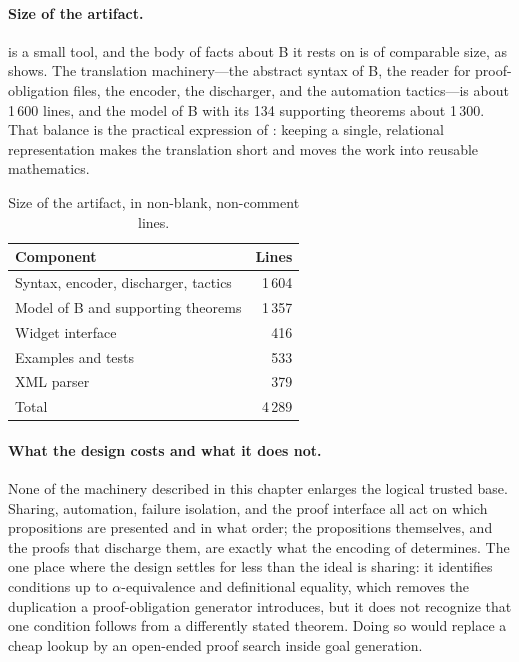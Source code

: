 \paragraph*{Size of the artifact.}
\barrel{} is a small tool, and the body of facts about B it rests on is of comparable size,
as  shows.
The translation machinery---the abstract syntax of B, the reader for proof-obligation
files, the encoder, the discharger, and the automation tactics---is about 1\,600 lines, and
the model of B with its 134 supporting theorems about 1\,300.
That balance is the practical expression of : keeping a
single, relational representation makes the translation short and moves the work into
reusable mathematics.

\begin{table}[t]
  \centering
  \small
  \begin{tabular}{lr}
    \toprule
    Component & Lines \\
    \midrule
    Syntax, encoder, discharger, tactics & 1\,604 \\
    Model of B and supporting theorems            & 1\,357 \\
    Widget interface                                  &    416 \\
    \midrule
    Examples and tests                                &    533 \\
    XML parser                                        &    379 \\
    \midrule
    Total                                             & 4\,289 \\
    \bottomrule
  \end{tabular}
  \caption{Size of the \barrel{} artifact, in non-blank, non-comment lines.}
  \label{tab:barrel-implementation}
\end{table}

\paragraph*{What the design costs and what it does not.}
None of the machinery described in this chapter enlarges the logical trusted base.
Sharing, automation, failure isolation, and the proof interface all act on which
propositions are presented and in what order; the propositions themselves, and the proofs
that discharge them, are exactly what the encoding of
 determines.
The one place where the design settles for less than the ideal is sharing: it identifies
conditions up to \(\alpha\)-equivalence and definitional equality, which removes the
duplication a proof-obligation generator introduces, but it does not recognize that one
condition follows from a differently stated theorem.
Doing so would replace a cheap lookup by an open-ended proof search inside goal
generation.

